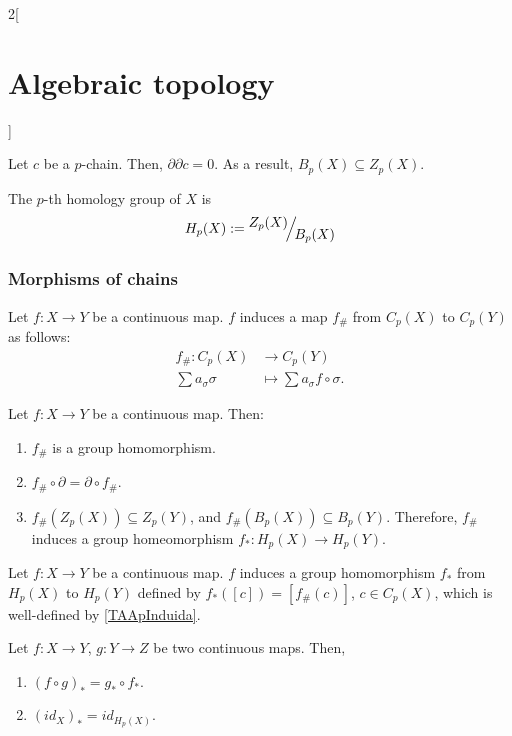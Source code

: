 \documentclass[../../../main_math.tex]{subfiles}
\begin{document}
\begin{multicols}{2}[\section{Algebraic topology}]
  \begin{lemma}
    Let $c$ be a $p$-chain. Then, $\partial \partial c=0$. As a result, $B_p(X)\subseteq Z_p(X)$.
  \end{lemma}

  \begin{definition}
    The $p$-th homology group of $X$ is $$H_p(X):=\quot{Z_p(X)}{B_p(X)}$$
  \end{definition}

  \subsubsection{Morphisms of chains}

  \begin{definition}
    Let $f: X \to Y$ be a continuous map. $f$ induces a map $f_{\#}$ from $C_p(X)$ to $C_p(Y)$ as follows:
    \begin{align*}
      f_{\#}: C_p(X)         & \longrightarrow C_p(Y)                    \\
      \sum a_{\sigma} \sigma & \longmapsto \sum a_{\sigma} f\circ\sigma.
    \end{align*}

  \end{definition}

  \begin{proposition}\label{TAApInduida}
    Let $f:X\to Y$ be a continuous map. Then:
    \begin{enumerate}
      \item $f_{\#}$ is a group homomorphism.
      \item $f_{\#}\circ \partial= \partial \circ f_{\#}$.
      \item $f_{\#}(Z_p(X))\subseteq Z_p(Y)$, and $f_{\#}(B_p(X))\subseteq B_p(Y)$. Therefore, $f_{\#}$ induces a group homeomorphism $f_{*}: H_p(X) \to H_p(Y)$.
    \end{enumerate}
  \end{proposition}

  \begin{definition}
    Let $f: X \to Y$ be a continuous map. $f$ induces a group homomorphism $f_{*}$ from $H_p(X)$ to $H_p(Y)$ defined by $f_{*}([c])=[f_{\#}(c)]$, $c\in C_p(X)$, which is well-defined by \cref{TAApInduida}.
  \end{definition}

  \begin{proposition}
    Let $f:X\to Y$, $g:Y\to Z$ be two continuous maps. Then,
    \begin{enumerate}
      \item $(f\circ g)_{*}=g_{*}\circ f_{*}$.
      \item $(id_{X})_*=id_{H_p(X)}$.
    \end{enumerate}
  \end{proposition}


\end{multicols}
\end{document}
